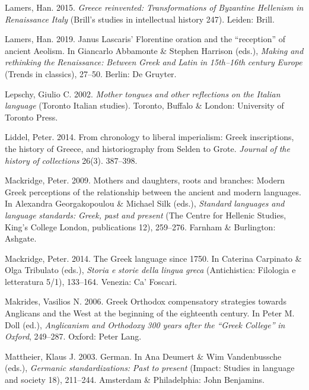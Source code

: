 Lamers, Han. 2015. \textit{Greece} \textit{reinvented:} \textit{Transformations} \textit{of} \textit{Byzantine} \textit{Hellenism} \textit{in} \textit{Renaissance} \textit{Italy} (Brill’s studies in intellectual history 247). Leiden: Brill.

Lamers, Han. 2019. Janus Lascaris’ Florentine oration and the “reception” of ancient Aeolism. In Giancarlo Abbamonte \& Stephen Harrison (eds.), \textit{Making} \textit{and} \textit{rethinking} \textit{the} \textit{Renaissance:} \textit{Between} \textit{Greek} \textit{and} \textit{Latin} \textit{in} \textit{15th–16th} \textit{century} \textit{Europe} (Trends in classics), 27–50. Berlin: De Gruyter.

Lepschy, Giulio C. 2002. \textit{Mother} \textit{tongues} \textit{and} \textit{other} \textit{reflections} \textit{on} \textit{the} \textit{Italian} \textit{language} (Toronto Italian studies). Toronto, Buffalo \& London: University of Toronto Press.

Liddel, Peter. 2014. From chronology to liberal imperialism: Greek inscriptions, the history of Greece, and historiography from Selden to Grote. \textit{Journal} \textit{of} \textit{the} \textit{history} \textit{of} \textit{collections} 26(3). 387–398.

Mackridge, Peter. 2009. Mothers and daughters, roots and branches: Modern Greek perceptions of the relationship between the ancient and modern languages. In Alexandra Georgakopoulou \& Michael Silk (eds.), \textit{Standard} \textit{languages} \textit{and} \textit{language} \textit{standards:} \textit{Greek,} \textit{past} \textit{and} \textit{present} (The Centre for Hellenic Studies, King’s College London, publications 12), 259–276. Farnham \& Burlington: Ashgate.

Mackridge, Peter. 2014. The Greek language since 1750. In Caterina Carpinato \& Olga Tribulato (eds.), \textit{Storia} \textit{e} \textit{storie} \textit{della} \textit{lingua} \textit{greca} (Antichistica: Filologia e letteratura 5/1), 133–164. Venezia: Ca’ Foscari.

Makrides, Vasilios N. 2006. Greek Orthodox compensatory strategies towards Anglicans and the West at the beginning of the eighteenth century. In Peter M. Doll (ed.), \textit{Anglicanism} \textit{and} \textit{Orthodoxy} \textit{300} \textit{years} \textit{after} \textit{the} \textit{“Greek} \textit{College”} \textit{in} \textit{Oxford}, 249–287. Oxford: Peter Lang.

Mattheier, Klaus J. 2003. German. In Ana Deumert \& Wim Vandenbussche (eds.), \textit{Germanic} \textit{standardizations:} \textit{Past} \textit{to} \textit{present} (Impact: Studies in language and society 18), 211–244. Amsterdam \& Philadelphia: John Benjamins.

